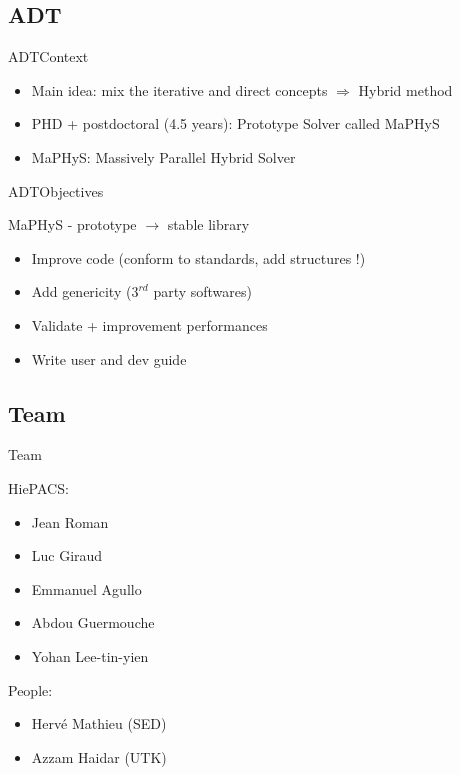 \documentclass[slideopt,A4]{beamer}
\begin{document}
%
\subsection{ADT}
\begin{frame}{ADT}{Context}
\begin{itemize}
\item Main idea: mix the iterative and direct concepts 
$\Rightarrow$ Hybrid method

\item PHD + postdoctoral (4.5 years): Prototype Solver called MaPHyS
\item MaPHyS: Massively Parallel Hybrid Solver
\end{itemize}
\end{frame}

\begin{frame}{ADT}{Objectives}

MaPHyS - prototype $\rightarrow$ stable library 

\begin{itemize}
\item<1-> Improve code (conform to standards, add structures !)
\item<2-> Add genericity ($3^{rd}$ party softwares)
\item<3-> Validate + improvement performances
\item<4-> Write user and dev guide
\end{itemize}

\end{frame}

%
\subsection{Team}
\begin{frame}{Team}

HiePACS:
  \begin{itemize}
  \item Jean Roman
  \item Luc Giraud
  \item Emmanuel Agullo
  \item Abdou Guermouche
  \item Yohan Lee-tin-yien
  \end{itemize}
\pause
People:
  \begin{itemize}
  \item Hervé Mathieu (SED)
  \item Azzam Haidar (UTK)
  \end{itemize}
\end{frame}
\end{document}
